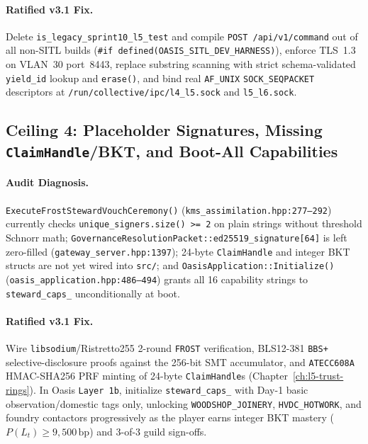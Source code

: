 \paragraph{Ratified v3.1 Fix.}
Delete \texttt{is\_legacy\_sprint10\_l5\_test} and compile \texttt{POST /api/v1/command} out of
all non-SITL builds (\texttt{\#if defined(OASIS\_SITL\_DEV\_HARNESS)}), enforce TLS~1.3 on VLAN~30
port~8443, replace substring scanning with strict schema-validated \texttt{yield\_id} lookup and
\texttt{erase()}, and bind real \texttt{AF\_UNIX} \texttt{SOCK\_SEQPACKET} descriptors at
\texttt{/run/collective/ipc/l4\_l5.sock} and \texttt{l5\_l6.sock}.

\subsection{Ceiling 4: Placeholder Signatures, Missing \texttt{ClaimHandle}/BKT, and Boot-All Capabilities}

\paragraph{Audit Diagnosis.}
\texttt{ExecuteFrostStewardVouchCeremony()} (\texttt{kms\_assimilation.hpp:277--292}) currently
checks \texttt{unique\_signers.size() >= 2} on plain strings without threshold Schnorr math;
\texttt{GovernanceResolutionPacket::ed25519\_signature[64]} is left zero-filled
(\texttt{gateway\_server.hpp:1397}); 24-byte \texttt{ClaimHandle} and integer BKT structs are
not yet wired into \texttt{src/}; and \texttt{OasisApplication::Initialize()}
(\texttt{oasis\_application.hpp:486--494}) grants all 16 capability strings to
\texttt{steward\_caps\_} unconditionally at boot.

\paragraph{Ratified v3.1 Fix.}
Wire \texttt{libsodium}/Ristretto255 2-round \texttt{FROST} verification, BLS12-381 \texttt{BBS+}
selective-disclosure proofs against the 256-bit SMT accumulator, and \texttt{ATECC608A}
HMAC-SHA256 PRF minting of 24-byte \texttt{ClaimHandle}s (Chapter~\ref{ch:l5-trust-rings}). In
Oasis \texttt{Layer 1b}, initialize \texttt{steward\_caps\_} with Day-1 basic observation/domestic
tags only, unlocking \texttt{WOODSHOP\_JOINERY}, \texttt{HVDC\_HOTWORK}, and foundry contactors
progressively as the player earns integer BKT mastery ($P(L_t) \ge 9{,}500\,\mathrm{bp}$) and
3-of-3 guild sign-offs.


